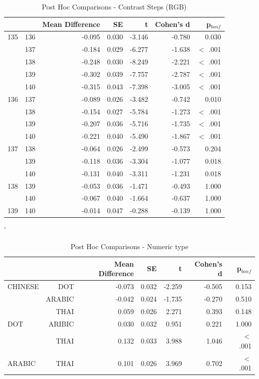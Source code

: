 \begin{longtable}{lrrrrrr}
	\hline\hline
\end{longtable} 

\newpage

\begin{table}[ht]
	\centering
	\caption{Post Hoc Comparisons - Contrast Steps (RGB)}
	\begin{tabular}{lrrrrrr}
		\hline
		 &  & Mean Difference & SE & t & Cohen's d & p$_{bonf}$  \\
		\hline
		135 & 136 & -0.095 & 0.030 & -3.146 & -0.780 & 0.030  \\
		  & 137 & -0.184 & 0.029 & -6.277 & -1.638 & $<$ .001  \\
		 & 138 & -0.248 & 0.030 & -8.249 & -2.221 & $<$ .001  \\
		 & 139 & -0.302 & 0.039 & -7.757 & -2.787 & $<$ .001  \\
		 & 140 & -0.315 & 0.043 & -7.398 & -3.005 & $<$ .001  \\
		136 & 137 & -0.089 & 0.026 & -3.482 & -0.742 & 0.010  \\
		  & 138 & -0.154 & 0.027 & -5.784 & -1.273 & $<$ .001  \\
		 & 139 & -0.207 & 0.036 & -5.716 & -1.735 & $<$ .001  \\
		 & 140 & -0.221 & 0.040 & -5.490 & -1.867 & $<$ .001  \\
		137 & 138 & -0.064 & 0.026 & -2.499 & -0.573 & 0.204  \\
		  & 139 & -0.118 & 0.036 & -3.304 & -1.077 & 0.018  \\
		 & 140 & -0.131 & 0.040 & -3.311 & -1.231 & 0.018  \\
		138 & 139 & -0.053 & 0.036 & -1.471 & -0.493 & 1.000  \\
		  & 140 & -0.067 & 0.040 & -1.664 & -0.637 & 1.000  \\
		139 & 140 & -0.014 & 0.047 & -0.288 & -0.139 & 1.000  \\
		\hline
	\end{tabular} 
	\label{tab:ttest_MatchedContrastAcc_Cross}
\end{table}'

\begin{table}[ht]
	\centering
	\caption{Post Hoc Comparisons - Numeric type}
	\begin{tabular}{lrrrrrr}
		\hline
		 &  & Mean Difference & SE & t & Cohen's d & p$_{bonf}$  \\
		\hline
		CHINESE & DOT & -0.073 & 0.032 & -2.259 & -0.505 & 0.153  \\
		  & ARABIC & -0.042 & 0.024 & -1.735 & -0.270 & 0.510  \\
		 & THAI & 0.059 & 0.026 & 2.271 & 0.393 & 0.148  \\
		DOT & ARIBIC & 0.030 & 0.032 & 0.951 & 0.221 & 1.000  \\
		  & THAI & 0.132 & 0.033 & 3.988 & 1.046 & $<$ .001  \\
		ARABIC & THAI & 0.101 & 0.026 & 3.969 & 0.702 & $<$ .001  \\
		\hline
	\end{tabular} 
	\label{tab:LangMatchedAcc_Cross}
\end{table}


